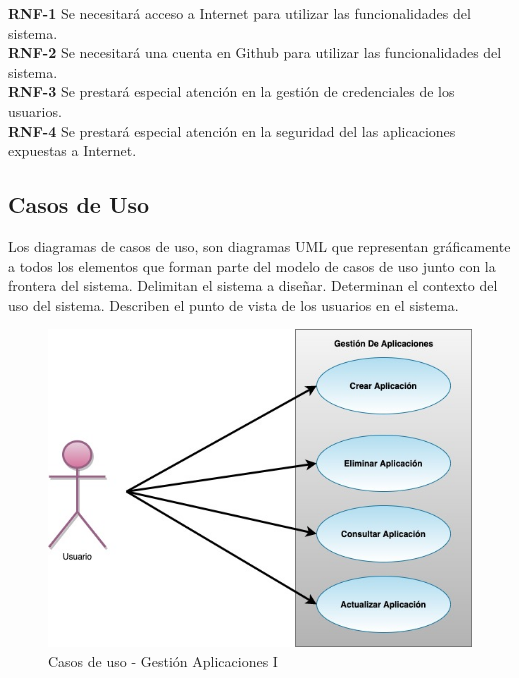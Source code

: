 \documentclass[a4paper,11pt]{book}
\begin{document}
\textbf{RNF-1} Se necesitará acceso a Internet para utilizar las funcionalidades del sistema.\\

\textbf{RNF-2} Se necesitará una cuenta en Github para utilizar las funcionalidades del sistema.\\

\textbf{RNF-3} Se prestará especial atención en la gestión de credenciales de los usuarios.\\

\textbf{RNF-4} Se prestará especial atención en la seguridad del  las aplicaciones expuestas a Internet.
\subsection{Casos de Uso}
Los diagramas de casos de uso, son diagramas UML que representan gráficamente a todos los elementos que forman parte del modelo de casos de uso junto con la frontera del sistema. Delimitan el sistema a diseñar. Determinan el contexto del uso del sistema. Describen el punto de vista de los usuarios  en el sistema.


\begin{figure}[H]
\centering
\includegraphics[scale=0.50]{imagenes/casosUso1.jpg}
\caption{ Casos de uso - Gestión Aplicaciones I\cite{diagrama}  }
\end{figure}
\end{document}
